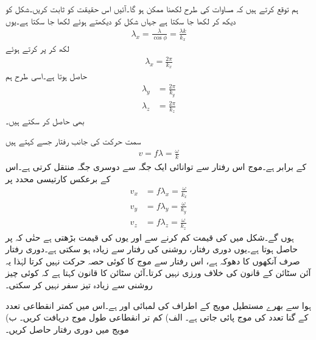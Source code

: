 ہم توقع کرتے ہیں کہ مساوات  کی طرح  لکھنا ممکن ہو گا۔آئیں اس حقیقت کو ثابت کریں۔شکل   کو دیکھ کر  لکھا جا سکتا ہے جہاں شکل کو دیکھتے ہوئے  لکھا جا سکتا ہے۔یوں
\begin{align*}
\lambda_x=\frac{\lambda}{\cos \phi}=\frac{\lambda k}{k_x}
\end{align*}
لکھ کر  پر کرتے ہوئے
\begin{align}
\lambda_x=\frac{2\pi}{k_x}
\end{align}
حاصل ہوتا ہے۔اسی طرح ہم 
\begin{align}
\lambda_y&=\frac{2\pi}{k_y}\\
\lambda_z&=\frac{2\pi}{k_z}
\end{align}
بھی حاصل کر سکتے ہیں۔

سمت حرکت کی جانب رفتار جسے  کہتے ہیں
\begin{align}
v=f\lambda=\frac{\omega}{k}
\end{align}
کے برابر ہے۔موج اس رفتار سے توانائی ایک جگہ سے دوسری جگہ منتقل کرتی ہے۔اس کے برعکس کارتیسی محدد پر  
\begin{align*}
v_x&=f \lambda_x=\frac{\omega}{k_x}\\
v_y&=f \lambda_y=\frac{\omega}{k_y}\\
v_z&=f \lambda_z=\frac{\omega}{k_z}
\end{align*}
ہوں گے۔شکل  میں  کی قیمت کم کرنے سے  اور یوں  کی قیمت بڑھتی ہے حتٰی کہ  پر  حاصل ہوتا ہے۔یوں دوری رفتار، روشنی کی رفتار سے زیادہ ہو سکتی ہے۔دوری رفتار  صرف آنکھوں کا دھوکہ ہے، اس رفتار سے موج کا کوئی حصہ حرکت نہیں کرتا لہٰذا یہ  آئن سٹائن کے قانون کی خلاف ورزی نہیں کرتا۔آئن سٹائن کا قانون کہتا ہے کہ کوئی چیز روشنی سے زیادہ تیز سفر نہیں کر سکتی۔

\newpage


ہوا سے بھرے مستطیل مویج کے اطراف کی لمبائی  اور  ہے۔اس میں کمتر انقطاعی تعدد کے  گنا تعدد کی موج پائی جاتی ہے۔ الف) کم تر انقطاعی طول موج دریافت کریں۔ ب) مویج میں دوری رفتار حاصل کریں۔

